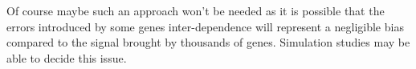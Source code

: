    Of course maybe such an approach won't be needed as it is possible that the errors introduced by some genes inter-dependence will represent a negligible bias compared to the signal brought by thousands of genes. Simulation studies may be able to decide this issue. 





	



